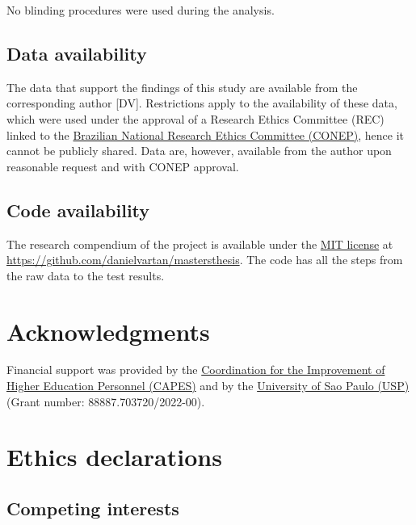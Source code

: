 \documentclass[
  12pt,
  a4paper,
  oneside]{tesesusp}
\begin{document}
No blinding procedures were used during the analysis.

\hypertarget{data-availability}{%
\subsection{Data availability}\label{data-availability}}

The data that support the findings of this study are available from the
corresponding author {[}DV{]}. Restrictions apply to the availability of
these data, which were used under the approval of a Research Ethics
Committee (REC) linked to the
\href{https://conselho.saude.gov.br/Web_comissoes/conep/index.html}{Brazilian
National Research Ethics Committee (CONEP)}, hence it cannot be publicly
shared. Data are, however, available from the author upon reasonable
request and with CONEP approval.

\hypertarget{code-availability}{%
\subsection{Code availability}\label{code-availability}}

The research compendium of the project is available under the
\href{https://opensource.org/license/mit/}{MIT license} at
\url{https://github.com/danielvartan/mastersthesis}. The code has all
the steps from the raw data to the test results.

\hypertarget{acknowledgments}{%
\section{Acknowledgments}\label{acknowledgments}}

Financial support was provided by the
\href{https://www.gov.br/capes/}{Coordination for the Improvement of
Higher Education Personnel (CAPES)} and by the
\href{http://usp.br/}{University of Sao Paulo (USP)} (Grant number:
88887.703720/2022-00).

\hypertarget{ethics-declarations}{%
\section{Ethics declarations}\label{ethics-declarations}}

\hypertarget{competing-interests}{%
\subsection{Competing interests}\label{competing-interests}}
\end{document}
